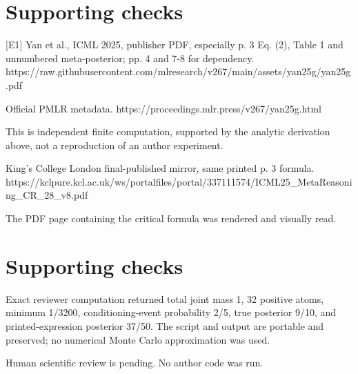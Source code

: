 \documentclass[10pt]{article}
\begin{document}
\section*{Supporting checks}
[E1] Yan et al., ICML 2025, publisher PDF, especially p. 3 Eq. (2), Table 1 and unnumbered meta-posterior; pp. 4 and 7-8 for dependency. https://raw.githubusercontent.com/mlresearch/v267/main/assets/yan25g/yan25g.pdf\par
[E2] Official PMLR metadata. https://proceedings.mlr.press/v267/yan25g.html\par
This is independent finite computation, supported by the analytic derivation above, not a reproduction of an author experiment.\par
[E5] King’s College London final-published mirror, same printed p. 3 formula. https://kclpure.kcl.ac.uk/ws/portalfiles/portal/337111574/ICML25\_MetaReasoning\_CR\_28\_v8.pdf\par
The PDF page containing the critical formula was rendered and visually read.\par
\section*{Supporting checks}
Exact reviewer computation returned total joint mass 1, 32 positive atoms, minimum 1/3200, conditioning-event probability 2/5, true posterior 9/10, and printed-expression posterior 37/50. The script and output are portable and preserved; no numerical Monte Carlo approximation was used.\par
Human scientific review is pending. No author code was run.\par
\end{document}
